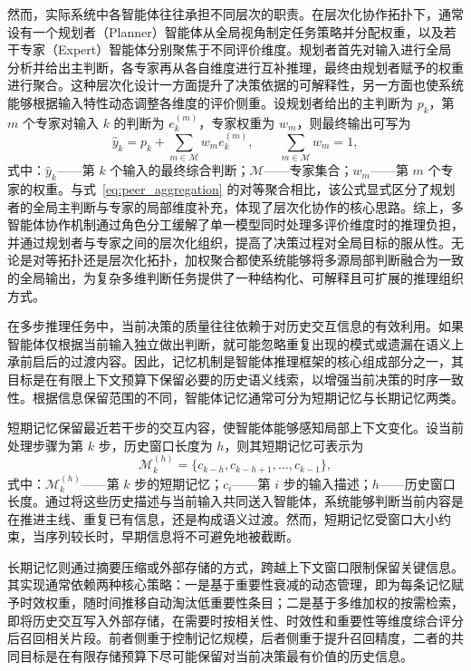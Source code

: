 然而，实际系统中各智能体往往承担不同层次的职责。在层次化协作拓扑下，通常设有一个规划者（Planner）智能体从全局视角制定任务策略并分配权重，以及若干专家（Expert）智能体分别聚焦于不同评价维度\cite{hong2024metagpt}。规划者首先对输入进行全局分析并给出主判断，各专家再从各自维度进行互补推理，最终由规划者赋予的权重进行聚合。这种层次化设计一方面提升了决策依据的可解释性，另一方面也使系统能够根据输入特性动态调整各维度的评价侧重。设规划者给出的主判断为 $p_k$，第 $m$ 个专家对输入 $k$ 的判断为 $e_k^{(m)}$，专家权重为 $w_m$，则最终输出可写为
\begin{equation}
\hat{y}_k=p_k+\sum_{m\in\mathcal{M}} w_m e_k^{(m)}, \qquad \sum_{m\in\mathcal{M}} w_m = 1,
\end{equation}
式中：$\hat{y}_k$——第 $k$ 个输入的最终综合判断；$\mathcal{M}$——专家集合；$w_m$——第 $m$ 个专家的权重。与式~\eqref{eq:peer_aggregation} 的对等聚合相比，该公式显式区分了规划者的全局主判断与专家的局部维度补充，体现了层次化协作的核心思路。综上，多智能体协作机制通过角色分工缓解了单一模型同时处理多评价维度时的推理负担，并通过规划者与专家之间的层次化组织，提高了决策过程对全局目标的服从性。无论是对等拓扑还是层次化拓扑，加权聚合都使系统能够将多源局部判断融合为一致的全局输出，为复杂多维判断任务提供了一种结构化、可解释且可扩展的推理组织方式。

\label{subsec:memory_agent}

在多步推理任务中，当前决策的质量往往依赖于对历史交互信息的有效利用。如果智能体仅根据当前输入独立做出判断，就可能忽略重复出现的模式或遗漏在语义上承前启后的过渡内容。因此，记忆机制是智能体推理框架的核心组成部分之一，其目标是在有限上下文预算下保留必要的历史语义线索，以增强当前决策的时序一致性\cite{wang2024survey_agent}。根据信息保留范围的不同，智能体记忆通常可分为短期记忆与长期记忆两类\cite{zhang2024survey_memory}。

短期记忆保留最近若干步的交互内容，使智能体能够感知局部上下文变化。设当前处理步骤为第 $k$ 步，历史窗口长度为 $h$，则其短期记忆可表示为
\begin{equation}
\mathcal{M}_k^{(h)} = \{c_{k-h},c_{k-h+1},\ldots,c_{k-1}\},
\end{equation}
式中：$\mathcal{M}_k^{(h)}$——第 $k$ 步的短期记忆；$c_i$——第 $i$ 步的输入描述；$h$——历史窗口长度。通过将这些历史描述与当前输入共同送入智能体，系统能够判断当前内容是在推进主线、重复已有信息，还是构成语义过渡。然而，短期记忆受窗口大小约束，当序列较长时，早期信息将不可避免地被截断。

长期记忆则通过摘要压缩或外部存储的方式，跨越上下文窗口限制保留关键信息。其实现通常依赖两种核心策略：一是基于重要性衰减的动态管理，即为每条记忆赋予时效权重，随时间推移自动淘汰低重要性条目\cite{zhong2024memorybank}；二是基于多维加权的按需检索，即将历史交互写入外部存储，在需要时按相关性、时效性和重要性等维度综合评分后召回相关片段\cite{park2023generative}。前者侧重于控制记忆规模，后者侧重于提升召回精度，二者的共同目标是在有限存储预算下尽可能保留对当前决策最有价值的历史信息。

